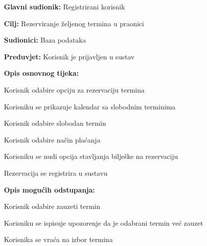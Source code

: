 \noindent {}
\begin{packed_item}
	
	\item \textbf{Glavni sudionik: } Registrirani korisnik
	\item  \textbf{Cilj:} Rezerviranje željenog termina u praonici
	\item  \textbf{Sudionici:} Baza podataka
	\item  \textbf{Preduvjet:} Korisnik je prijavljen u sustav
	\item  \textbf{Opis osnovnog tijeka:}
	
	\item[] \begin{packed_enum}
		
		\item Korisnik odabire opciju za rezervaciju termina
		\item Korisniku se prikazuje kalendar sa slobodnim terminima
		\item Korisnik odabire slobodan termin
		\item Korisnik odabire način plaćanja
		\item Korisniku se nudi opcija stavljanja bilješke na rezervaciju
		\item Rezervacija se registrira u sustavu
		
	\end{packed_enum}
	
	\item  \textbf{Opis mogućih odstupanja:}
	
	\item[] \begin{packed_item}
		
		\item[2.a] Korisnik odabire zauzeti termin
		\item[] \begin{packed_enum}
			
			\item Korisniku se ispisuje upozorenje da je odabrani termin već zauzet
			\item Korisnika se vraća na izbor termina
			
		\end{packed_enum}
		
	\end{packed_item}
\end{packed_item}

